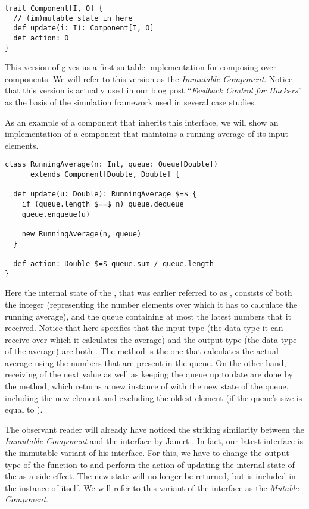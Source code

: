 \begin{lstlisting}[style=InlineScalaStyle]
trait Component[I, O] {
  // (im)mutable state in here
  def update(i: I): Component[I, O]
  def action: O
}
\end{lstlisting}

This version of \comp gives us a first suitable implementation for composing over components. We will refer to this version as the \textit{Immutable Component}. Notice that this version is actually used in our blog post ``\textit{Feedback Control for Hackers}'' \cite{heest2015-feedback-for-hackers} as the basis of the simulation framework used in several case studies.

As an example of a component that inherits this interface, we will show an implementation of a component that maintains a running average of its input elements.

\begin{lstlisting}[style=ScalaStyle]
class RunningAverage(n: Int, queue: Queue[Double])
      extends Component[Double, Double] {

  def update(u: Double): RunningAverage $=$ {
    if (queue.length $==$ n) queue.dequeue
    queue.enqueue(u)

    new RunningAverage(n, queue)
  }

  def action: Double $=$ queue.sum / queue.length
}
\end{lstlisting}

Here the internal state of the \comp, that was earlier referred to as , consists of both the integer  (representing the number elements over which it has to calculate the running average), and the queue containing at most the latest  numbers that it received. Notice that  here specifies that the input type (the data type it can receive over which it calculates the average) and the output type (the data type of the average) are both . The  method is the one that calculates the actual average using the numbers that are present in the queue. On the other hand, receiving of the next value as well as keeping the queue up to date are done by the  method, which returns a new instance of  with the new state of the queue, including the new element and excluding the oldest element (if the queue's size is equal to ).

The observant reader will already have noticed the striking similarity between the \textit{Immutable Component} and the  interface by Janert \cite{janert2013-feedback}. In fact, our latest \comp interface is the immutable variant of his interface. For this, we have to change the output type of the  function to  and perform the action of updating the internal state of the \comp as a side-effect. The new state will no longer be returned, but is included in the instance of \comp itself. We will refer to this variant of the interface as the \textit{Mutable Component}.

